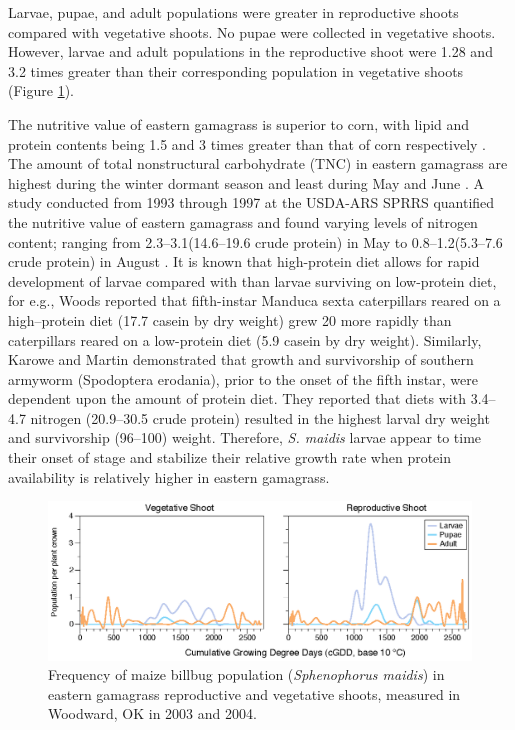 \documentclass[agronomy,article,submit,moreauthors,pdftex,10pt,a4paper]{mdpi}
\theoremstyle{mdpi}
\newcounter{ex}
\newcounter{re}
\theoremstyle{mdpidefinition}
\begin{document}
Larvae, pupae, and adult populations were greater in reproductive shoots compared with vegetative shoots. No pupae were collected in vegetative shoots. However, larvae and adult populations in the reproductive shoot were 1.28 and 3.2 times greater than their corresponding population in vegetative shoots (Figure \ref{fig:f3}). 




The nutritive value of eastern gamagrass is superior to corn, with lipid and protein contents being 1.5 and 3 times greater than that of corn respectively \cite{bargman89}. The amount of total nonstructural carbohydrate (TNC) in eastern gamagrass are highest during the winter dormant season and least during May and June \cite{dewald_kd}. A study conducted from 1993 through 1997 at the USDA-ARS SPRRS quantified the nutritive value of eastern gamagrass and found varying levels of nitrogen content; ranging from 2.3–3.1\text{\%}(14.6–19.6\text{\%} crude protein) in May to 0.8–1.2\text{\%}(5.3–7.6\text{\%} crude protein) in August \cite{gillen99}. It is known that high-protein diet allows for rapid development of larvae compared with than larvae surviving on low-protein diet, for e.g., Woods \cite{woods99} reported that fifth-instar Manduca sexta caterpillars reared on a high–protein diet (17.7\text{\%} casein by dry weight) grew 20\text{\%} more rapidly than caterpillars reared on a low-protein diet (5.9\text{\%} casein by dry weight). Similarly, Karowe and Martin \cite{karowe89} demonstrated that growth and survivorship of southern armyworm (Spodoptera erodania), prior to the onset of the fifth instar, were dependent upon the amount of protein diet. They reported that diets with 3.4–4.7\text{\%} nitrogen (20.9–30.5\text{\%} crude protein) resulted in the highest larval dry weight and survivorship (96–100\text{\%}) weight. Therefore, \textit{S. maidis} larvae appear to time their onset of stage and stabilize their relative growth rate when protein availability is relatively higher in eastern gamagrass.


\begin{figure}
  \includegraphics[width=\linewidth]{Fig3.eps}
  \caption{Frequency of maize billbug population (\textit{Sphenophorus maidis}) in eastern gamagrass reproductive and vegetative shoots, measured in Woodward, OK in 2003 and 2004. }
  \label{fig:f3}
\end{figure}
\end{document}
